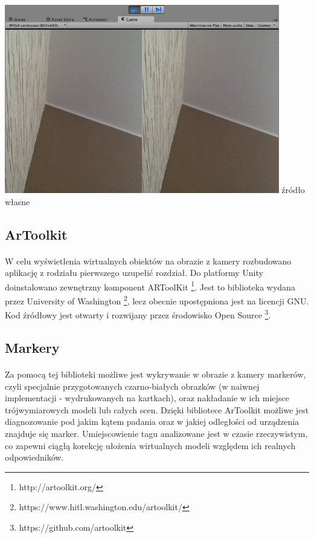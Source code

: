 \begin{center}
\includegraphics[width=0.9\textwidth]{images/kadr.jpg}
\small {źródło własne}
\end{center}

\subsection{ArToolkit}
\paragraph{}
W celu wyświetlenia wirtualnych obiektów na obrazie z kamery rozbudowano aplikację z rodziału pierwszego {\color{red}uzupełić rozdział}. Do platformy Unity doinstalowano zewnętrzny komponent ARToolKit  \footnote{http://artoolkit.org/}. Jest to biblioteka wydana przez University of Washington \footnote{https://www.hitl.washington.edu/artoolkit/}, lecz obecnie upostępniona jest na licencji GNU. Kod źródłowy jest otwarty i rozwijany przez środowisko Open Source \footnote{https://github.com/artoolkit}.
\subsection{Markery}
\paragraph{}
Za pomocą tej biblioteki możliwe jest wykrywanie w obrazie z kamery markerów, czyli specjalnie przygotowanych czarno-białych obrazków (w naiwnej implementacji - wydrukowanych na kartkach), oraz nakładanie w ich miejsce trójwymiarowych modeli lub całych scen. Dzięki bibliotece ArToolkit możliwe jest diagnozowanie pod jakim kątem padania oraz w jakiej odległości od urządzenia znajduje się marker. Umiejscowienie tagu analizowane jest w czasie rzeczywistym, co zapewni ciągłą korekcję ułożenia wirtualnych modeli względem ich realnych odpowiedników.

